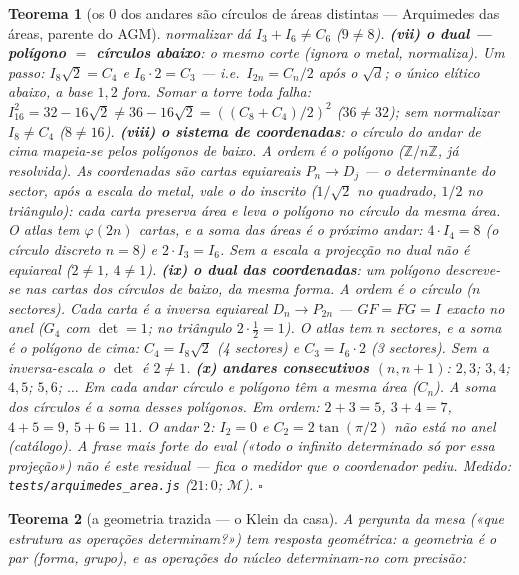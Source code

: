 \documentclass[11pt,a4paper]{article}
\newtheorem{teorema}{Teorema}
\newcommand{\code}[1]{\texttt{#1}}
\begin{document}
\begin{teorema}[os $0$ dos andares são círculos de áreas distintas ---
Arquimedes das áreas, parente do AGM]
normalizar dá $I_{3}+I_{6}\neq C_{6}$ ($9\neq8$).
\textbf{(vii) o dual --- polígono $=$ círculos abaixo}: o mesmo corte
(ignora o metal, normaliza). Um passo:
$I_{8}\sqrt2=C_{4}$ e $I_{6}\cdot 2=C_{3}$ --- i.e.\ $I_{2n}=C_{n}/2$
após o $\sqrt{d}$; o único elítico abaixo, a base $1,2$ fora.
Somar a \emph{torre} toda falha:
$I_{16}^{2}=32-16\sqrt2\neq36-16\sqrt2=((C_{8}+C_{4})/2)^{2}$
($36\neq32$); sem normalizar $I_{8}\neq C_{4}$ ($8\neq16$).
\textbf{(viii) o sistema de coordenadas}: o círculo do andar de cima
mapeia-se pelos polígonos de baixo. A \emph{ordem} é o polígono
($\mathbb{Z}/n\mathbb{Z}$, já resolvida). As \emph{coordenadas} são
cartas equiareais $P_{n}\to D_{j}$ --- o determinante do sector, após
a escala do metal, vale o do inscrito ($1/\sqrt2$ no quadrado,
$1/2$ no triângulo): cada carta preserva área e leva o polígono no
círculo da mesma área. O atlas tem $\varphi(2n)$ cartas, e a soma das
áreas é o próximo andar: $4\cdot I_{4}=8$ (o círculo discreto $n=8$)
e $2\cdot I_{3}=I_{6}$. Sem a escala a projecção no dual \emph{não}
é equiareal ($2\neq1$, $4\neq1$).
\textbf{(ix) o dual das coordenadas}: um polígono descreve-se nas
cartas dos círculos de baixo, da mesma forma. A \emph{ordem} é o
círculo ($n$ sectores). Cada carta é a inversa equiareal
$D_{n}\to P_{2n}$ --- $GF=FG=I$ exacto no anel ($G_{4}$ com
$\det=1$; no triângulo $2\cdot\tfrac12=1$). O atlas tem $n$
sectores, e a soma é o polígono de cima:
$C_{4}=I_{8}\sqrt2$ (4 sectores) e $C_{3}=I_{6}\cdot 2$ (3 sectores).
Sem a inversa-escala o $\det$ é $2\neq1$.
\textbf{(x) andares consecutivos $(n,n{+}1)$}: $2,3$; $3,4$; $4,5$;
$5,6$; $\ldots$
Em cada andar círculo e polígono têm a \emph{mesma área} ($C_{n}$).
A soma dos círculos é a soma desses polígonos. Em ordem:
$2{+}3=5$, $3{+}4=7$, $4{+}5=9$, $5{+}6=11$.
O andar $2$: $I_{2}=0$ e $C_{2}=2\tan(\pi/2)$ não está no anel
(catálogo).
A frase mais forte do eval («todo o infinito determinado só por essa
projeção») \emph{não} é este residual --- fica o medidor que o
coordenador pediu.
\emph{Medido:} \code{tests/arquimedes\_area.js} ($21{:}0$; $\mathcal{M}$).
$\square$
\end{teorema}\begin{teorema}[a geometria trazida --- o Klein da casa]\label{thm:geometria}
A pergunta da mesa («que estrutura as operações determinam?») tem
resposta geométrica: \emph{a geometria é o par (forma, grupo)}, e as
operações do núcleo determinam-no com precisão:
\end{teorema}
\end{document}

